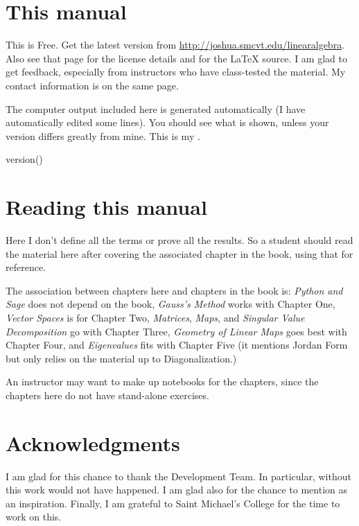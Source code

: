 \section{This manual}
This is Free.
Get the latest version from 
\url{http://joshua.smcvt.edu/linearalgebra}.
Also see that page for the license details and for 
the \LaTeX{} source.
I am glad to get feedback, especially from instructors
who have class-tested the material.
My contact information is on the same page. 

The computer output included here is generated automatically 
(I have automatically edited some lines).
You should see what is shown, unless your version differs
greatly from mine.
This is my \Sage.
\begin{sagecode}
version()  
\end{sagecode}



\section{Reading this manual}
Here I don't define all the terms or prove all the results.
So a student should read the material here after covering the associated
chapter in the book, using that for reference.

The association between chapters here and chapters in the book is:
\textit{Python and Sage} does not depend on the
book,
\textit{Gauss’s Method} works with Chapter One,
\textit{Vector Spaces} is for Chapter Two,
\textit{Matrices}, 
\textit{Maps}, and 
\textit{Singular Value Decomposition} go with Chapter Three,
\textit{Geometry of Linear Maps} goes best with Chapter Four,
and \textit{Eigenvalues} fits with Chapter Five
(it mentions Jordan Form but only relies on the material up to 
Diagonalization.)

An instructor may want to make up \Sage{} notebooks for the chapters,
since the chapters here do not have stand-alone exercises.




\section{Acknowledgments}
I am glad for this chance to thank the \Sage{} Development Team.
In particular,
without \citep{SageTeam12ref} this work would not have happened.
I am glad also for the chance to mention 
\citep{Beezer11} as an inspiration.
Finally, I am grateful to Saint Michael's College for the time to work on this.





